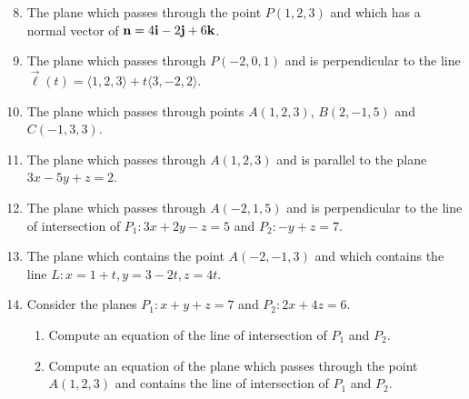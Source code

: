 \documentclass[12pt]{article}
\newif\ifans
\begin{document}
\begin{enumerate}
\setcounter{enumi}{7}

\item The plane which passes through the point $P(1,2,3)$ and which has a normal vector of ${\bf n}=4{\bf i}-2{\bf j}+6{\bf k}$.

\ifans{\fbox{$4(x-1)-2(y-2)+6(z-3)=0$}} \fi

\item The plane which passes through $P(-2,0,1)$ and is perpendicular to the line $\overrightarrow{\ell}(t)=\langle 1,2,3 \rangle +t \langle 3,-2,2\rangle$.

\ifans{\fbox{$3(x+2)-2y+2(z-1)=0$}} \fi

\item The plane which passes through points $A(1,2,3)$, $B(2,-1,5)$ and $C(-1,3,3)$.

\ifans{\fbox{$-2(x-1)-4(y-2)-5(z-3)=0$}} \fi

\item The plane which passes through $A(1,2,3)$ and is parallel to the plane $3x-5y+z=2$.

\ifans{\fbox{$3(x-1)-5(y-2)+1(z-3)=0$}} \fi

\item The plane which passes through $A(-2,1,5)$ and is perpendicular to the line of intersection of $P_1: 3x+2y-z=5$ and $P_2: -y+z=7$.

\ifans{\fbox{$1(x+2)-3(y-1)-3(z-5)=0$}} \fi

\item The plane which contains the point $A(-2,-1,3)$ and which contains the line $L: x=1+t, y=3-2t, z=4t$.

\ifans{\fbox{$2(x+2)-3(y+1)-2(z-3)=0$}} \fi

\item Consider the planes $P_1: x+y+z=7$ and $P_2: 2x+4z=6$.

\begin{enumerate}

\item Compute an equation of the line of intersection of $P_1$ and $P_2$.

\ifans{\fbox{\parbox{1\linewidth}{One parametric equation of the line of intersection is $L: x=3-2t, y=4+t, z=t$}}} \fi

\item Compute an equation of the plane which passes through the point $A(1,2,3)$ and contains the line of intersection of $P_1$ and $P_2$.

\ifans{\fbox{$5(x-1)+4(y-2)+6(z-3)=0$}} \fi


\end{enumerate}
\end{enumerate}
\end{document}
